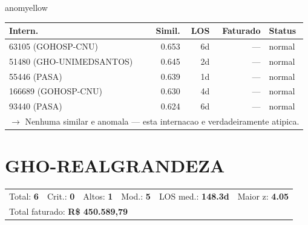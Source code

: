 \documentclass[a4paper,10pt]{article}
\begin{document}
\begin{anomalycard}[Internacao 63 | GHO-POSTAL | MODERADO (z=2.00)]{anomyellow}
\begin{tabular}{l r r r l}\toprule\textbf{Intern.} & \textbf{Simil.} & \textbf{LOS} & \textbf{Faturado} & \textbf{Status} \\\midrule
63105 (GOHOSP-CNU) & 0.653 & 6d & --- & \textcolor{jcubeblue}{normal} \\
51480 (GHO-UNIMEDSANTOS) & 0.645 & 2d & --- & \textcolor{jcubeblue}{normal} \\
55446 (PASA) & 0.639 & 1d & --- & \textcolor{jcubeblue}{normal} \\
166689 (GOHOSP-CNU) & 0.630 & 4d & --- & \textcolor{jcubeblue}{normal} \\
93440 (PASA) & 0.624 & 6d & --- & \textcolor{jcubeblue}{normal} \\
\multicolumn{5}{l}{\textcolor{jcubeblue}{\small $\rightarrow$ Nenhuma similar e anomala --- esta internacao e verdadeiramente atipica.}} \\
\bottomrule\end{tabular}


\end{anomalycard}

\newpage

\clearpage
\section{GHO-REALGRANDEZA}
\begin{tcolorbox}[colback=lightblue,colframe=jcubeblue,title={\textbf{Resumo --- GHO-REALGRANDEZA}}]
\begin{tabular}{ll@{\quad}ll@{\quad}ll}
Total: \textbf{6} &
Crit.: \textcolor{anomred}{\textbf{0}} &
Altos: \textcolor{anomorange}{\textbf{1}} &
Mod.: \textcolor{anomyellow}{\textbf{5}} &
LOS med.: \textbf{148.3d} &
Maior z: \textbf{4.05} \\

\multicolumn{6}{l}{Total faturado: \textbf{R\$ 450.589,79}} \\

\end{tabular}
\end{tcolorbox}
\end{document}
